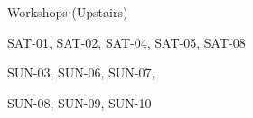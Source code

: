 \documentclass{article}
\newcommand{\room}[1]{
    \noindent
    #1
    \vspace{.2in}

}
\begin{document}
\rssheader[2in]

\vfill

\fontsize{30pt}{36pt}
\selectfont

\begin{minipage}{\textwidth}
    \begin{minipage}{.25\textwidth}
        \begin{center}
            \rssarrowup[1in]
        \end{center}
    \end{minipage}
    \hfill
    \begin{minipage}{.7\textwidth}
        \begin{center}
            \room{Workshops (Upstairs)}
\fontsize{18pt}{24pt} \selectfont
            \room{SAT-01, SAT-02, SAT-04, SAT-05, SAT-08}
            \room{SUN-03, SUN-06, SUN-07, \par SUN-08, SUN-09, SUN-10}
        \end{center}
    \end{minipage}
\end{minipage}

\vfill
\end{document}
